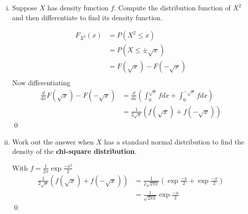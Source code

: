 \begin{enumerate}[i)]
    \item Suppose $X$ has density function $f$. Compute the distribution function of $X^2$ and then differentiate to find its density function.
    \begin{mdframed}
    \begin{align*}
        F_{X^2}(x) &= P(X^2 \leq x) \\
        &= P(X \leq \pm \sqrt{x}) \\
        &= F(\sqrt{x}) - F(-\sqrt{x}) \\
    \end{align*}
    Now differentiating 
    \begin{align*}
        \frac{d}{dx}F(\sqrt{x}) - F(-\sqrt{x}) &= \frac{d}{dx}\left(\int_0^{\sqrt{x}}fdx + \int_0^{-\sqrt{x}}fdx\right) \\
        &= \frac{1}{2\sqrt{x}}\left( f(\sqrt{x}) + f(-\sqrt{x})\right)
    \end{align*}\qed
    \end{mdframed}
    \item Work out the answer when $X$ has a standard normal distribution to find the density of the \textbf{chi-square distribution}.
    \begin{mdframed}
        With $f = \frac{1}{2\pi}\exp{\frac{-x^2}{2}}$
    \begin{align*}
        \frac{1}{2\sqrt{x}}\left( f(\sqrt{x}) + f(-\sqrt{x})\right) &= \frac{1}{2\sqrt{2\pi x}}\left(\exp{\frac{-x}{2}}+ \exp{\frac{-x}{2}}\right) \\
        &= \frac{1}{\sqrt{2\pi x}}\exp{\frac{-x}{2}}
    \end{align*}\qed
    \end{mdframed}
\end{enumerate}





